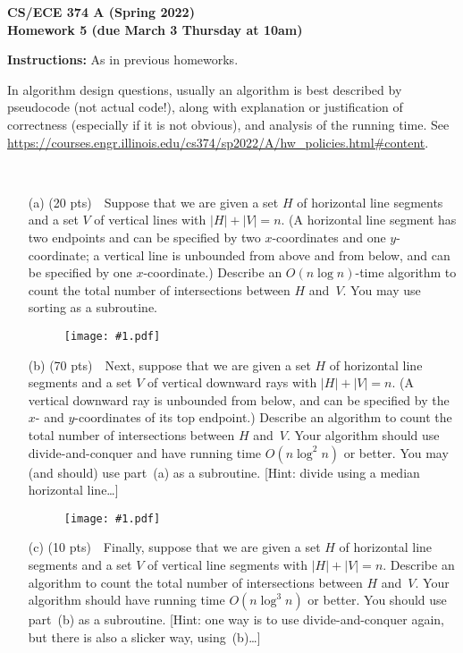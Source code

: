 \documentclass[11pt]{article}
\newcommand{\fig}[2]{\begin{figure}[h]\begin{center}%
  \texttt{[image: \#1.pdf]}\end{center}%
  \end{figure}}
\begin{document}
\begin{center}\Large\bf 
CS/ECE 374 A (Spring 2022)\\
{\Large Homework 5} (due March 3 Thursday at 10am)
\end{center}

\medskip\noindent
{\bf Instructions:} As in previous homeworks.

\bigskip\noindent
In algorithm design questions, usually an algorithm is best described by pseudocode (not actual code!), along with explanation or justification of correctness (especially if it is not obvious), and analysis of the running time.  See \url{https://courses.engr.illinois.edu/cs374/sp2022/A/hw_policies.html#content}.

\begin{description}
\bigskip
\item[Problem 5.1:] \

\begin{enumerate}
\item[(a)] (20 pts)\ \ 
Suppose that we are given a set $H$ of horizontal line segments and a set
$V$ of vertical lines with $|H|+|V|=n$.  (A horizontal line segment has two endpoints and can be specified by two $x$-coordinates
and one $y$-coordinate; a vertical line is unbounded from above and from below, and can be specified by one $x$-coordinate.)
Describe an $O(n\log n)$-time algorithm to count the total number of intersections between $H$ and~$V$.
You may use sorting as a subroutine.

\fig{hw5fig}{0.5,page=1}

\item[(b)] (70 pts)\ \
Next, suppose that we are given a set $H$ of horizontal line segments and a set $V$ of vertical downward rays with $|H|+|V|=n$.  (A vertical downward ray is unbounded from below, and can be specified by the $x$- and $y$-coordinates of its top endpoint.)
Describe an algorithm to count the total number of intersections between $H$ and~$V$.
Your algorithm should use divide-and-conquer and have running time $O(n\log^2n)$ or better.  
You may (and should) use part~(a) as a subroutine.
[Hint: divide using a median horizontal line\ldots]

\fig{hw5fig}{0.5,page=2}

\newpage
\item[(c)] (10 pts)\ \
Finally, suppose that we are given a set $H$ of horizontal line segments and a set $V$ of vertical line segments with $|H|+|V|=n$.
Describe an algorithm to count the total number of intersections between $H$ and~$V$.
Your algorithm should have running time $O(n\log^3n)$ or better.
You should use part~(b) as a subroutine.
[Hint: one way is to use divide-and-conquer again, but there is also a slicker way, using~(b)\ldots]


\end{enumerate}
\end{description}
\end{document}
